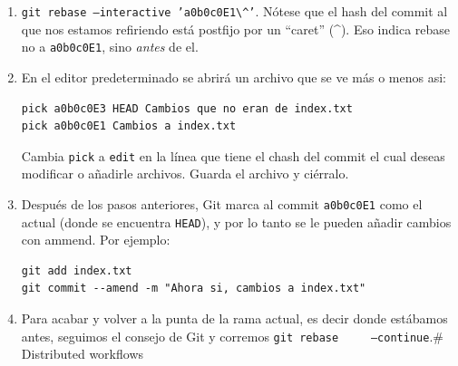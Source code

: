 \documentclass[spanish, 12pt, a4paper]{article}
\begin{document}
\begin{enumerate}
\def\labelenumi{\arabic{enumi}.}
\item
  \passthrough{\lstinline!git rebase –interactive ’a0b0c0E1\^’!}. Nótese
  que el hash del commit al que nos estamos refiriendo está postfijo por
  un ``caret'' (\^{}). Eso indica rebase no a
  \passthrough{\lstinline!a0b0c0E1!}, sino \emph{antes} de el.
\item
  En el editor predeterminado se abrirá un archivo que se ve más o menos
  asi:

\begin{lstlisting}
pick a0b0c0E3 HEAD Cambios que no eran de index.txt
pick a0b0c0E1 Cambios a index.txt
\end{lstlisting}

  Cambia \passthrough{\lstinline!pick!} a \passthrough{\lstinline!edit!}
  en la línea que tiene el chash del commit el cual deseas modificar o
  añadirle archivos. Guarda el archivo y ciérralo.
\item
  Después de los pasos anteriores, Git marca al commit
  \passthrough{\lstinline!a0b0c0E1!} como el actual (donde se encuentra
  \passthrough{\lstinline!HEAD!}), y por lo tanto se le pueden añadir
  cambios con ammend. Por ejemplo:

\begin{lstlisting}
git add index.txt
git commit --amend -m "Ahora si, cambios a index.txt"
\end{lstlisting}
\item
  Para acabar y volver a la punta de la rama actual, es decir donde
  estábamos antes, seguimos el consejo de Git y corremos
  \passthrough{\lstinline!git rebase     –continue!}.\# Distributed
  workflows
\end{enumerate}
\end{document}
